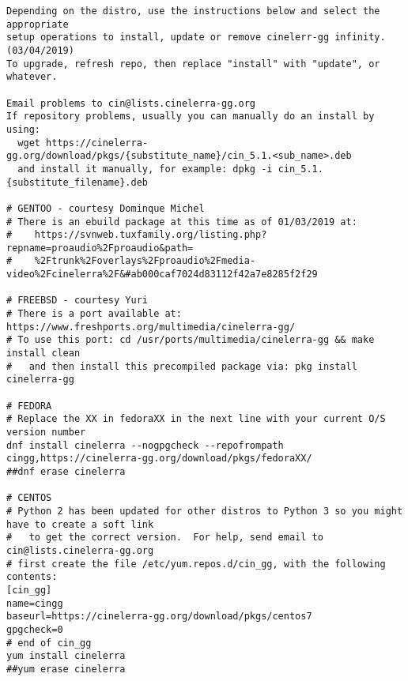\begin{lstlisting}[numbers=none]
Depending on the distro, use the instructions below and select the appropriate 
setup operations to install, update or remove cinelerr-gg infinity.  (03/04/2019)
To upgrade, refresh repo, then replace "install" with "update", or whatever.

Email problems to cin@lists.cinelerra-gg.org
If repository problems, usually you can manually do an install by using:
  wget https://cinelerra-gg.org/download/pkgs/{substitute_name}/cin_5.1.<sub_name>.deb
  and install it manually, for example: dpkg -i cin_5.1.{substitute_filename}.deb

# GENTOO - courtesy Dominque Michel
# There is an ebuild package at this time as of 01/03/2019 at:
#    https://svnweb.tuxfamily.org/listing.php?repname=proaudio%2Fproaudio&path=
#    %2Ftrunk%2Foverlays%2Fproaudio%2Fmedia-video%2Fcinelerra%2F&#ab000caf7024d83112f42a7e8285f2f29

# FREEBSD - courtesy Yuri
# There is a port available at: https://www.freshports.org/multimedia/cinelerra-gg/
# To use this port: cd /usr/ports/multimedia/cinelerra-gg && make install clean
#   and then install this precompiled package via: pkg install cinelerra-gg

# FEDORA
# Replace the XX in fedoraXX in the next line with your current O/S version number
dnf install cinelerra --nogpgcheck --repofrompath cingg,https://cinelerra-gg.org/download/pkgs/fedoraXX/
##dnf erase cinelerra

# CENTOS
# Python 2 has been updated for other distros to Python 3 so you might have to create a soft link
#   to get the correct version.  For help, send email to cin@lists.cinelerra-gg.org
# first create the file /etc/yum.repos.d/cin_gg, with the following contents:
[cin_gg]
name=cingg
baseurl=https://cinelerra-gg.org/download/pkgs/centos7
gpgcheck=0
# end of cin_gg
yum install cinelerra
##yum erase cinelerra


\end{lstlisting}
